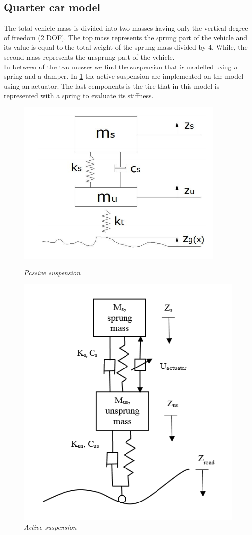 \documentclass{article}
\numberwithin{equation}{section}
\numberwithin{figure}{section}
\numberwithin{table}{section}
\numberwithin{table}{section}
\begin{document}
\subsection{Quarter car model}
The total vehicle mass is divided into two masses having only the vertical degree of freedom (2 DOF). The top mass represents the sprung part of the vehicle and its value is equal to the total weight of the sprung mass divided by 4. While, the second mass represents the unsprung part of the vehicle.\\
In between of the two masses we find the suspension that is modelled using a spring and a damper. In \cref{fig:5} the active suspension are implemented on the model using an actuator. The last components is the tire that in this model is represented with a spring to evaluate its stiffness. \\

\begin{figure}[H]
\centering
\begin{minipage}{.4\textwidth}
  \centering
  \includegraphics[width=.69\linewidth]{Pictures/quarter car.png}
  \caption{\emph{Passive suspension}}
  \label{fig:4}
\end{minipage}%
\begin{minipage}{.5\textwidth}
  \centering
  \includegraphics[width=.4\linewidth]{Pictures/quarter_car_diagram.PNG}
  \caption{\emph{Active suspension}}
  \label{fig:5}
\end{minipage}
\end{figure}
\end{document}

